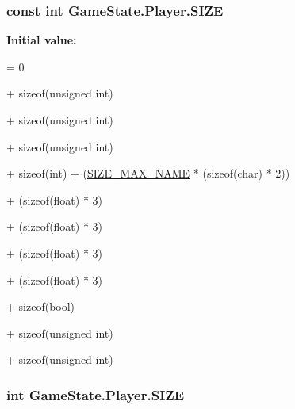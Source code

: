 \hypertarget{class_game_state_1_1_player_a07b452f69128e1f3f6d3bb575c2976f1}{
\subsubsection[{S\-I\-Z\-E}]{\setlength{\rightskip}{0pt plus 5cm}const int Game\-State.\-Player.\-S\-I\-Z\-E\hspace{0.3cm}{\ttfamily [static]}}}\label{class_game_state_1_1_player_a07b452f69128e1f3f6d3bb575c2976f1}
{\bfseries Initial value\-:}
\begin{DoxyCode}
= 0
            
            + \textcolor{keyword}{sizeof}(\textcolor{keywordtype}{unsigned} int)
            
            + \textcolor{keyword}{sizeof}(\textcolor{keywordtype}{unsigned} \textcolor{keywordtype}{int})
            
            + \textcolor{keyword}{sizeof}(\textcolor{keywordtype}{unsigned} int)
            
            + \textcolor{keyword}{sizeof}(\textcolor{keywordtype}{int}) + (\hyperlink{class_game_state_1_1_player_a1cdc9de8183b220e87632f7f6a7147d0}{SIZE\_MAX\_NAME} * (\textcolor{keyword}{sizeof}(char) * 2))
            
            + (\textcolor{keyword}{sizeof}(\textcolor{keywordtype}{float}) * 3)
            
            + (\textcolor{keyword}{sizeof}(\textcolor{keywordtype}{float}) * 3)
            
            + (\textcolor{keyword}{sizeof}(\textcolor{keywordtype}{float}) * 3)
            
            + (\textcolor{keyword}{sizeof}(\textcolor{keywordtype}{float}) * 3)
            
            + \textcolor{keyword}{sizeof}(\textcolor{keywordtype}{bool})
            
            + \textcolor{keyword}{sizeof}(\textcolor{keywordtype}{unsigned} int)
            
            + \textcolor{keyword}{sizeof}(\textcolor{keywordtype}{unsigned} \textcolor{keywordtype}{int})
\end{DoxyCode}
\hypertarget{class_game_state_1_1_player_ada2d068d3d5f973f73abac805c162d17}{
\subsubsection[{S\-I\-Z\-E}]{\setlength{\rightskip}{0pt plus 5cm}int Game\-State.\-Player.\-S\-I\-Z\-E\hspace{0.3cm}{\ttfamily [static]}}}\label{class_game_state_1_1_player_ada2d068d3d5f973f73abac805c162d17}
